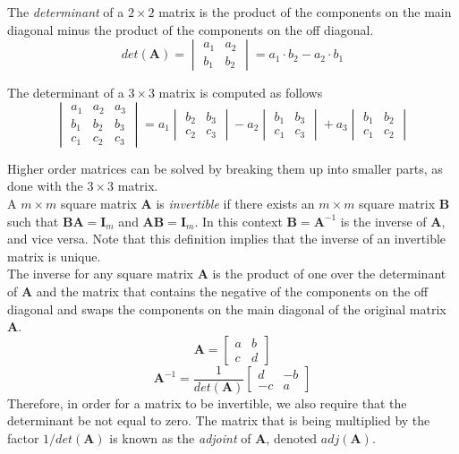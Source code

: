 \documentclass[12pt]{article}
\begin{document}
The \emph{determinant} of a $2\times2$ matrix is the product of the components on the main diagonal minus the product of the components on the off diagonal.
\[
det(\mathbf{A})=
\begin{vmatrix}
a_1 & a_2 \\
b_1 & b_2
\end{vmatrix}
= a_1\cdot b_2 - a_2\cdot b_1
\]

The determinant of a $3\times3$ matrix is computed as follows
\[
\begin{vmatrix}
a_1 & a_2 & a_3\\
b_1 & b_2 & b_3 \\
c_1 & c_2 & c_3
\end{vmatrix}
=
a_1
\begin{vmatrix}
b_2 & b_3 \\
c_2 & c_3
\end{vmatrix}
- a_2
\begin{vmatrix}
b_1 & b_3 \\
c_1 & c_3
\end{vmatrix}
+ a_3
\begin{vmatrix}
b_1 & b_2 \\
c_1 & c_2
\end{vmatrix}
\]

Higher order matrices can be solved by breaking them up into smaller parts, as done with the $3\times3$ matrix. \\

A $m\times m$ square matrix $\mathbf{A}$ is \emph{invertible} if there exists an $m\times m$ square matrix $\mathbf{B}$ such that $\mathbf{BA}=\mathbf{I}_m$ and $\mathbf{AB}=\mathbf{I}_m$. In this context $\mathbf{B}=\mathbf{A}^{-1}$ is the inverse of $\mathbf{A}$, and vice versa. Note that this definition implies that the inverse of an invertible matrix is unique. \\

The inverse for any square matrix $\mathbf{A}$ is the product of one over the determinant of $\mathbf{A}$ and the matrix that contains the negative of the components on the off diagonal and swaps the components on the main diagonal of the original matrix $\mathbf{A}$.
\[
\mathbf{A}=
\begin{bmatrix}
a & b \\
c & d
\end{bmatrix}
\]
\[
\mathbf{A}^{-1}=
\frac{1}{det(\mathbf{A})}
\begin{bmatrix}
d & -b \\
-c & a
\end{bmatrix}
\]
Therefore, in order for a matrix to be invertible, we also require that the determinant be not equal to zero. The matrix that is being multiplied by the factor $1/det(\mathbf{A})$ is known as the \emph{adjoint} of $\mathbf{A}$, denoted $adj(\mathbf{A})$. \\
\end{document}
